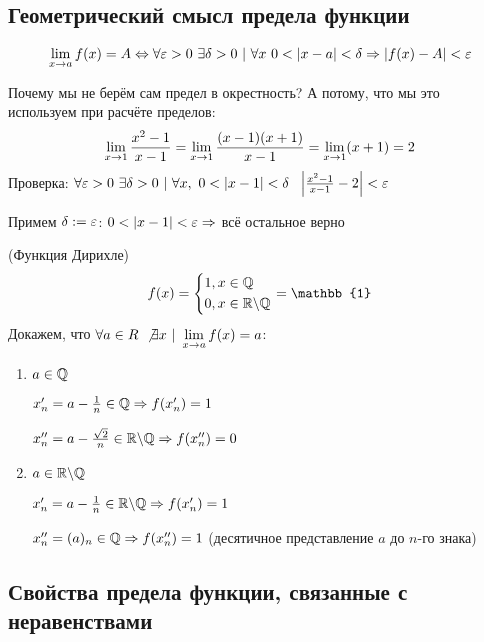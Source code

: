 \subsection{Геометрический смысл предела функции}

$$
	\lim\limits_{x \rightarrow a} f(x) = A \Leftrightarrow \forall \varepsilon > 0\ \exists \delta > 0\ |\ \forall x\ 0 < |x - a| < \delta \Rightarrow |f(x) - A| < \varepsilon
$$


\begin{example}
	Почему мы не берём сам предел в окрестность? А потому, что мы это используем при расчёте пределов:
	$$
		\lim\limits_{x \rightarrow 1} \frac{x^2 - 1}{x - 1} = \lim\limits_{x \rightarrow 1} \frac{(x - 1)(x + 1)}{x - 1} = \lim\limits_{x \rightarrow 1} (x + 1) = 2
	$$
	Проверка:
	$\forall \eps > 0\ \exists \delta > 0\ |\ \forall x,\ 0 < |x - 1| < \delta\ \ \left|\frac{x^2 - 1}{x - 1} - 2\right| < \eps$
	
	Примем $\delta := \varepsilon$: $0 < |x - 1| < \varepsilon \Rightarrow $ всё остальное верно
\end{example}

\begin{example} (Функция Дирихле)
	$$
		f(x) = \System{&{1, x \in \Q} \\ &{0, x \in \R \bs \Q}} = \mathbb{1}
	$$
	Докажем, что $\forall a \in R\ \not\exists x\ |\ \lim\limits_{x \rightarrow a} f(x) = a$:
	
	\begin{enumerate}
		\item $a \in \mathbb{Q}$
		
		$x'_n = a - \frac{1}{n} \in \mathbb{Q} \Rightarrow f(x'_n) = 1$
		
		$x''_n = a - \frac{\sqrt{2}}{n} \in \mathbb{R} \backslash \mathbb{Q} \Rightarrow f(x''_n) = 0$
		
		\item $a \in \mathbb{R} \backslash \mathbb{Q}$
		
		$x'_n = a - \frac{1}{n} \in \mathbb{R} \backslash \mathbb{Q} \Rightarrow f(x'_n) = 1$
		
		$x''_n = (a)_n \in \mathbb{Q} \Rightarrow f(x''_n) = 1$ (десятичное представление $a$ до $n$-го знака)
	\end{enumerate}
\end{example}

\subsection{Свойства предела функции, связанные с неравенствами}

